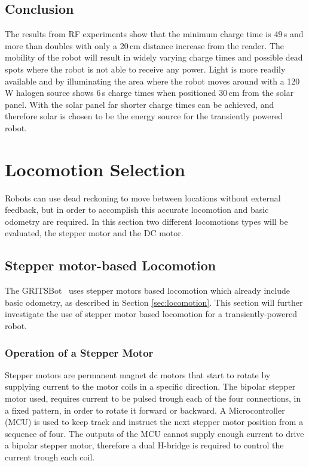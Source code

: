 \subsection{Conclusion}

The results from RF experiments show that the minimum charge time is 49\,s and more than doubles with only a 20\,cm distance increase from the reader.
The mobility of the robot will result in widely varying charge times and possible dead spots where the robot is not able to receive any power.
Light is more readily available and by illuminating the area where the robot moves around with a 120\,W halogen source shows 6\,s charge times when positioned 30\,cm from the solar panel.
With the solar panel far shorter charge times can be achieved, and therefore solar is chosen to be the energy source for the transiently powered robot.

\section{Locomotion Selection}
\label{sec:pre_locomotion_selection}

Robots can use dead reckoning to move between locations without external feedback, but in order to accomplish this accurate locomotion and basic odometry are required.
In this section two different locomotions types will be evaluated, the stepper motor and the DC motor.

\subsection{Stepper motor-based Locomotion}

The GRITSBot~\cite{pickem_icra_2015} uses stepper motors based locomotion which already include basic odometry, as described in Section \ref{sec:locomotion}.
This section will further investigate the use of stepper motor based locomotion for a transiently-powered robot.

\subsubsection{Operation of a Stepper Motor}
Stepper motors are permanent magnet dc motors that start to rotate by supplying current to the motor coils in a specific direction.
The bipolar stepper motor used, requires current to be pulsed trough each of the four connections, in a fixed pattern, in order to rotate it forward or backward.
A Microcontroller (MCU) is used to keep track and instruct the next stepper motor position from a sequence of four.
The outputs of the MCU cannot supply enough current to drive a bipolar stepper motor, therefore a dual H-bridge is required to control the current trough each coil.

